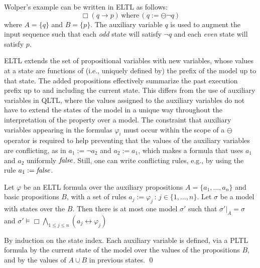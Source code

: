 \noindent
Wolper's example can be written in ELTL
as follows:
\begin{equation} 
\label{form3}
\Box ( q \rightarrow p ) \, \mathrm{where} \, 
 ( q := \ominus \neg q)
\end{equation}
where $A = \{ q\}$ and $B = \{ p \}$.
The auxiliary variable $q$ is used to augment the input sequence such that each {\em odd} state will satisfy $\neg q$
and each {\em even} state will satisfy $p$.  


ELTL extends the set of propositional variables with new variables, whose values at a state are
functions of (i.e., uniquely defined by) the prefix of the model up to that state. The added propositions effectively summarize the past execution prefix up to and
including the current state.
This differs from 
the use of auxiliary variables in QLTL, where the values assigned to the
auxiliary variables do not have to extend the 
states of the model in a unique way throughout the interpretation of 
the property over a model. The constraint that auxiliary variables appearing in the formulas $\varphi_i$ 
must occur within the scope of a $\ominus$ operator
is required to help preventing that the values
of the auxiliary variables are conflicting, as in
$a_1 := \neg a_2$ and $a_2 := a_1$, which makes a formula
that uses $a_1$ and $a_2$ uniformly $\mathit{false}$. Still, one can write conflicting rules, e.g., by using the rule $a_1 : = \mathit{false}$.

\begin{lemma} \label{fourone}
Let $\varphi$ be an ELTL formula
over the auxiliary propositions $A = \{ a_1 , \ldots , a_n \}$ and basic propositions $B$, with
a set of rules $a_j  := \varphi_j \, : \, 
 {j \in \{1, \ldots , n\}}$. 
Let $\sigma$ be a model with states over the $B$. 
Then there is at most one
model $\sigma'$ such that $\sigma' |_A = \sigma$ and $\sigma' \models \Box \bigwedge_{1 \leq j \leq n} ( a_j \leftrightarrow \varphi_j) $


\end{lemma}


 By induction on the state index. Each auxiliary variable
is defined, via a PLTL formula by the current state of the model over the values of the propositions $B$, and by the values of $A \cup B$ in previous states.  \qed


